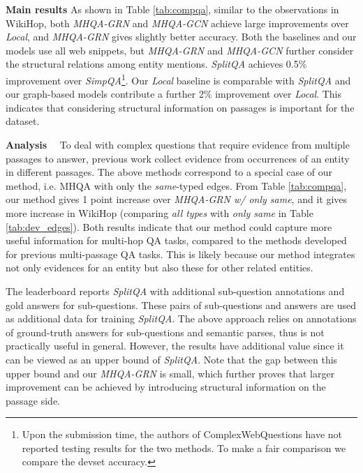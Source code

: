 \documentclass[letterpaper]{article}
\begin{document}
\vspace{0.5em}
\textbf{Main results}
As shown in Table \ref{tab:compqa}, similar to the observations in WikiHop, both \emph{MHQA-GRN} and \emph{MHQA-GCN} achieve large improvements over \emph{Local}, and \emph{MHQA-GRN} gives slightly better accuracy.
Both the baselines and our models use all web snippets, but \emph{MHQA-GRN} and \emph{MHQA-GCN} further consider the structural relations among entity mentions.
\emph{SplitQA} achieves 0.5\% improvement over \emph{SimpQA}\footnote{Upon the submission time, the authors of ComplexWebQuestions have not reported testing results for the two methods. To make a fair comparison we compare the devset accuracy.}. 
Our \emph{Local} baseline is comparable with \emph{SplitQA} and our graph-based models contribute a further 2\% improvement over \emph{Local}. 
This indicates that considering structural information on passages is important for the dataset.


\vspace{0.5em}
\textbf{Analysis}~~
To deal with complex questions that require evidence from multiple passages to answer, previous work \citep{wang2018evidence,lin2018denoising,wang2018joint} 
collect evidence from occurrences of an entity in different passages.
The above methods correspond to a special case of our method, i.e. MHQA with only the \emph{same}-typed edges.
From Table \ref{tab:compqa}, our method gives 1 point increase over \emph{MHQA-GRN w/ only same}, and it gives more increase in WikiHop (comparing \emph{all types} with \emph{only same} in Table \ref{tab:dev_edges}).
Both results indicate that our method could capture more useful information for multi-hop QA tasks, compared to the methods developed for previous multi-passage QA tasks.
This is likely because our method integrates not only evidences for an entity but also these for other related entities.


The leaderboard reports \emph{SplitQA} with additional sub-question annotations and gold answers for sub-questions.
These pairs of sub-questions and answers are used as additional data for training \emph{SplitQA}. 
The above approach relies on annotations of ground-truth answers for sub-questions and semantic parses, thus is not practically useful in general. 
However, the results have additional value since it can be viewed as an upper bound of \emph{SplitQA}. 
Note that the gap between this upper bound and our \emph{MHQA-GRN} is small, which further proves that larger improvement can be achieved by introducing structural information on the passage side.
\end{document}
